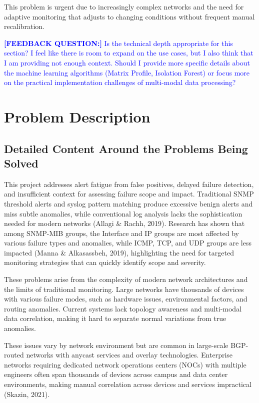 \documentclass[11pt]{article}
\begin{document}
This problem is urgent due to increasingly complex networks and the need for adaptive monitoring that adjusts to changing conditions without frequent manual recalibration.

\textcolor{blue}{\textbf{[FEEDBACK QUESTION:]} Is the technical depth appropriate for this section? I feel like there is room to expand on the use cases, but I also think that I am providing not enough context. Should I provide more specific details about the machine learning algorithms (Matrix Profile, Isolation Forest) or focus more on the practical implementation challenges of multi-modal data processing?}

\section{Problem Description}

\subsection{Detailed Content Around the Problems Being Solved}

This project addresses alert fatigue from false positives, delayed failure detection, and insufficient context for assessing failure scope and impact. Traditional SNMP threshold alerts and syslog pattern matching produce excessive benign alerts and miss subtle anomalies, while conventional log analysis lacks the sophistication needed for modern networks (Allagi \& Rachh, 2019). Research has shown that among SNMP-MIB groups, the Interface and IP groups are most affected by various failure types and anomalies, while ICMP, TCP, and UDP groups are less impacted (Manna \& Alkasassbeh, 2019), highlighting the need for targeted monitoring strategies that can quickly identify scope and severity.

These problems arise from the complexity of modern network architectures and the limits of traditional monitoring. Large networks have thousands of devices with various failure modes, such as hardware issues, environmental factors, and routing anomalies. Current systems lack topology awareness and multi-modal data correlation, making it hard to separate normal variations from true anomalies.

These issues vary by network environment but are common in large-scale BGP-routed networks with anycast services and overlay technologies. Enterprise networks requiring dedicated network operations centers (NOCs) with multiple engineers often span thousands of devices across campus and data center environments, making manual correlation across devices and services impractical (Skazin, 2021).
\end{document}
